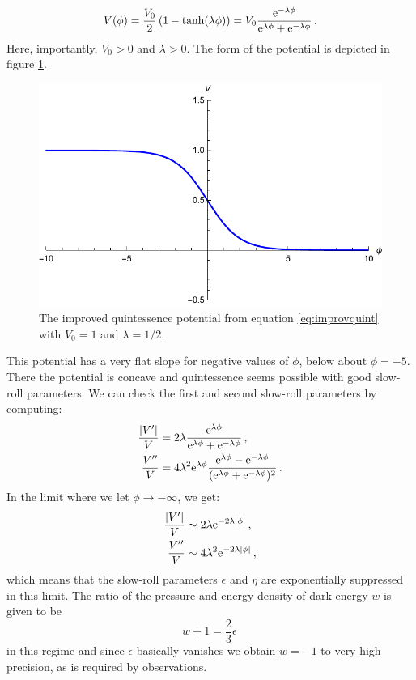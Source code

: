 \documentclass[12pt]{report}
\newcommand{\be}{\begin{equation}}
\newcommand{\ee}{\end{equation}}
\newcommand{\bea}{\begin{equation}\begin{aligned}}
\newcommand{\eea}{\end{aligned}\end{equation}}
\def\rme{{\rm e}}
\begin{document}
\be 
V(\phi) = \frac{V_0}{2} \left(1- \tanh (\lambda \phi)\right) = V_0\frac{\rme^ {-\lambda \phi}}{\rme^ {\lambda \phi}+ \rme^ {-\lambda \phi}}\,.
\label{eq:improvquint}
\ee
Here, importantly, $V_0 >0$ and $\lambda >0$. The form of the potential is depicted in figure \ref{fig:quintpot1}.
\begin{figure}[htb]
     \centering
     \includegraphics[scale=0.9]{quintpot1.pdf}
     \caption{The improved quintessence potential from equation \eqref{eq:improvquint} with $V_0=1$ and $\lambda= 1/2$.}
     \label{fig:quintpot1}
\end{figure}
This potential has a very flat slope for negative values of $\phi$, below about $\phi = -5$. There the potential is concave and quintessence seems possible with good slow-roll parameters. We can check the first and second slow-roll parameters by computing:
\bea 
\frac{|V^ \prime|}{V} &= 2 \lambda \frac{\rme^ {\lambda \phi}}{\rme^ {\lambda \phi} + \rme^ {-\lambda \phi}}\,,\\
\frac{V^{\prime \prime}}{V} &= 4 \lambda^ 2 \rme^ {\lambda \phi} \frac{\rme^ {\lambda \phi}-\rme^ {-\lambda \phi}}{(\rme^ {\lambda \phi} + \rme^ {-\lambda \phi})^2}\,.
\eea
In the limit where we let $\phi \to -\infty$, we get:
\bea 
\frac{|V^ \prime|}{V} &\sim 2 \lambda \rme^ {-2\lambda |\phi|}\,,\\
\frac{V^ {\prime \prime}}{V} &\sim 4 \lambda^ 2 \rme^{-2 \lambda |\phi|}\,,
\eea
which means that the slow-roll parameters $\epsilon$ and $\eta$ are exponentially suppressed in this limit. The ratio of the pressure and energy density of dark energy $w$ is given to be \cite{Agrawal:2018own} 
\be 
w+1 = \frac{2}{3} \epsilon\,
\ee
in this regime and since $\epsilon$ basically vanishes we obtain $w=-1$ to very high precision, as is required by observations.\\
\end{document}

